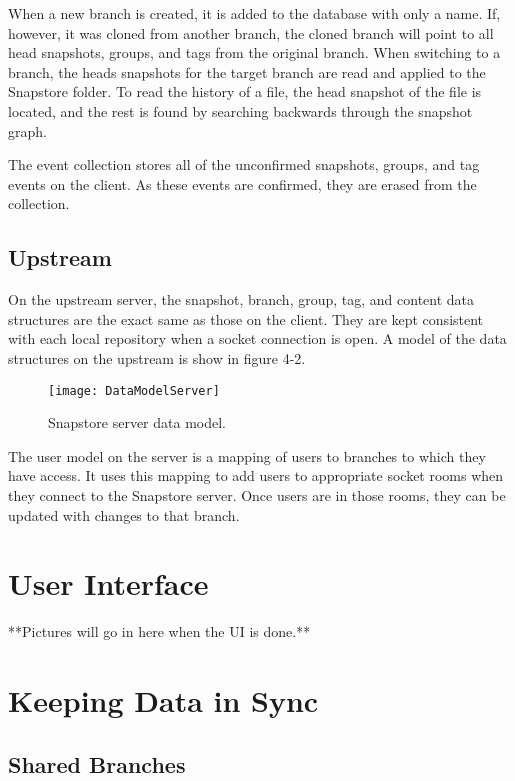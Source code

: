 When a new branch is created, it is added to the database with only a name. If, however, it was cloned from another branch, the cloned branch will point to all head snapshots, groups, and tags from the original branch. When switching to a branch, the heads snapshots for the target branch are read and applied to the Snapstore folder. To read the history of a file, the head snapshot of the file is located, and the rest is found by searching backwards through the snapshot graph.

The event collection stores all of the unconfirmed snapshots, groups, and tag events on the client. As these events are confirmed, they are erased from the collection.

\subsection{Upstream}

On the upstream server, the snapshot, branch, group, tag, and content data structures are the exact same as those on the client. They are kept consistent with each local repository when a socket connection is open. A model of the data structures on the upstream is show in figure 4-2.

\begin{figure}
\texttt{[image: DataModelServer]}
\caption{Snapstore server data model.}
\label{arm:fig1}
\end{figure}

The user model on the server is a mapping of users to branches to which they have access. It uses this mapping to add users to appropriate socket rooms when they connect to the Snapstore server. Once users are in those rooms, they can be updated with changes to that branch.

\section{User Interface}

**Pictures will go in here when the UI is done.**

\section{Keeping Data in Sync}

\subsection{Shared Branches}

